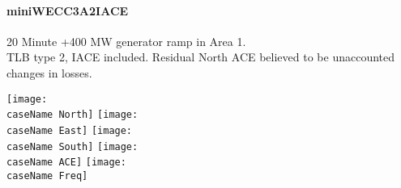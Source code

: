 \documentclass[12pt]{article}
\newcommand{\caseName}{ }
\begin{document}
\renewcommand{\caseName}{miniWECC3A2IACE}
\paragraph{miniWECC3A2IACE} 20 Minute +400 MW generator ramp in Area 1. \\
TLB type 2, IACE included. Residual North ACE believed to be unaccounted changes in losses.

	\texttt{[image: \\caseName North]}
	\texttt{[image: \\caseName East]} 
	\texttt{[image: \\caseName South]} 
	\texttt{[image: \\caseName ACE]} 
	\texttt{[image: \\caseName Freq]} 
	
\pagebreak
\end{document}
